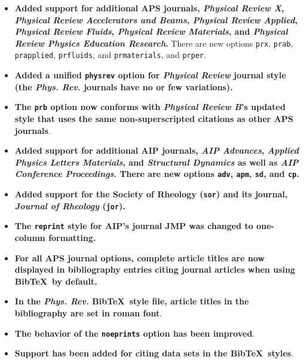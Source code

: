 \documentclass[%
,aps%
 ,twocolumn%
 ,secnumarabic%
,amssymb, amsmath,nobibnotes, aps, prl, floatfix]{revtex4-2}
\begin{document}
\begin{itemize}
\item \textbf{Added support for additional APS journals,  \textit{Physical Review X},  \textit{Physical Review Accelerators and Beams}, \textit{Physical Review Applied}, \textit{Physical Review Fluids}, \textit{Physical Review Materials}, and \textit{Physical Review Physics Education Research}.} There are new options \texttt{prx},  \texttt{prab}, \texttt{prapplied}, \texttt{prfluids}, and \texttt{prmaterials}, and \texttt{prper}.

\item \textbf{Added a unified \texttt{physrev} option for \textit{Physical Review} journal style (the \textit{Phys. Rev.} journals have no or few variations).}

\item \textbf{The \texttt{prb} option now conforms with \textit{Physical Review B}'s updated style that uses the same non-superscripted citations as other APS journals}.

\item \textbf{Added support for additional AIP journals, \textit{AIP Advances}, \textit{Applied Physics Letters Materials}, and \textit{Structural Dynamics} as well as \textit{AIP Conference Proceedings}. There are new options \texttt{adv}, \texttt{apm}, \texttt{sd}, and \texttt{cp}.}

\item \textbf{Added support for the  Society of Rheology (\texttt{sor}) and its journal, \textit{Journal of Rheology} (\texttt{jor}).}

\item \textbf{The \texttt{reprint} style for AIP's journal JMP was changed to one-column formatting.}

\item \textbf{For all APS journal options, complete article titles are now displayed in bibliography entries citing journal articles when using Bib\TeX\ by default.}

\item \textbf{In the \textit{Phys. Rev.} Bib\TeX\ style file, article titles in the bibliography are set in roman font}.    

\item \textbf{The behavior of the \texttt{noeprints} option has been improved}.    

\item \textbf{Support has been added for citing data sets in the Bib\TeX\ styles}.


\end{itemize}
\end{document}
